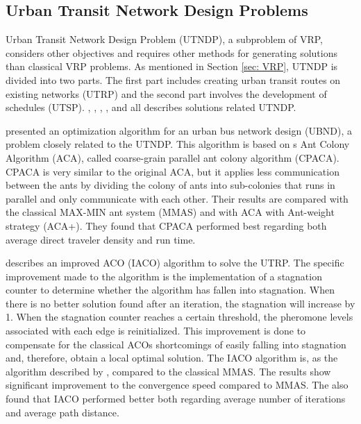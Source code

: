 \subsection{Urban Transit Network Design Problems}
\label{subsec:relatedWorkUTNDP}

Urban Transit Network Design Problem (UTNDP), a subproblem of VRP, considers other objectives and requires other methods for generating solutions than classical VRP problems. As mentioned in Section \vref{sec: VRP}, UTNDP is divided into two parts. The first part includes creating urban transit routes on existing networks (UTRP) and the second part involves the development of schedules (UTSP). \citet{yang07}, \citet{jiang10}, \citet{poorzahedy11}, \citet{nikolic14}, and \citet{kechagiopoulos14} all describes solutions related UTNDP. %

\citet{yang07} presented an optimization algorithm for an urban bus network design (UBND), a problem closely related to the UTNDP. This algorithm is based on \citet{dorigo96}s Ant Colony Algorithm (ACA), called coarse-grain parallel ant colony algorithm (CPACA). CPACA is very similar to the original ACA, but it applies less communication between the ants by dividing the colony of ants into sub-colonies that runs in parallel and only communicate with each other. Their results are compared with the classical MAX-MIN ant system (MMAS) \citep{stutzle99} and with ACA with Ant-weight strategy (ACA+). They found that CPACA performed best regarding both average direct traveler density and run time. 

\citet{jiang10} describes an improved ACO (IACO) algorithm to solve the UTRP. The specific improvement made to the algorithm is the implementation of a stagnation counter to determine whether the algorithm has fallen into stagnation. When there is no better solution found after an iteration, the stagnation will increase by 1. When the stagnation counter reaches a certain threshold, the pheromone levels associated with each edge is reinitialized. This improvement is done to compensate for the classical ACOs shortcomings of easily falling into stagnation and, therefore, obtain a local optimal solution. The IACO algorithm is, as the algorithm described by \citet{yang07}, compared to the classical MMAS. The results show significant improvement to the convergence speed compared to MMAS. The also found that IACO performed better both regarding average number of iterations and average path distance. 

